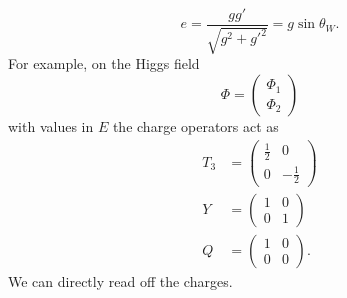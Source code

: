 \documentclass[12pt]{amsart}
\theoremstyle{definition}
\theoremstyle{remark}
\numberwithin{equation}{section}
\begin{document}
\begin{equation*}
e=\frac{gg'}{\sqrt{g^2+g'^2}}=g\sin\theta_W.
\end{equation*}
For example, on the Higgs field 
\begin{equation*}
\Phi=\left(\begin{array}{c}\Phi_1\\\Phi_2\end{array}\right)
\end{equation*}
with values in $E$ the charge operators act as
\begin{align*}
T_3&=\left(\begin{array}{cc}\frac{1}{2} & 0 \\ 0 &-\frac{1}{2}\end{array}\right)\\
Y&=\left(\begin{array}{cc}1 & 0 \\0 & 1\end{array}\right)\\
Q&=\left(\begin{array}{cc}1 & 0 \\0 & 0\end{array}\right).
\end{align*}
We can directly read off the charges.
\end{document}
